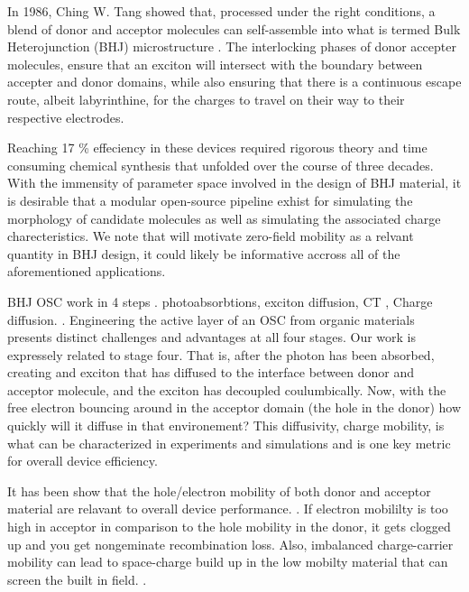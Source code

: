 In 1986, Ching W. Tang
showed that, processed under the right conditions, a blend of donor and acceptor molecules can self-assemble
into what is termed Bulk Heterojunction (BHJ) microstructure \cite{Tang1986c}. 
The interlocking phases of donor accepter molecules, ensure
that an exciton will intersect with the boundary between accepter and donor domains, while also ensuring that
there
is a continuous escape route, albeit labyrinthine, for the charges to travel on their way to their respective electrodes. 

Reaching 17 \% effeciency in these devices required rigorous theory and time consuming chemical synthesis
that unfolded over the course of three decades.  
With the immensity of parameter space involved in the design of BHJ material, it is desirable that a modular
open-source pipeline exhist for simulating the morphology of candidate molecules as well as simulating the 
associated charge charecteristics. 
We note that will motivate zero-field mobility as a relvant quantity in BHJ
design, it could likely be informative accross all of the aforementioned applications. 


BHJ OSC work in 4 steps . photoabsorbtions, exciton diffusion, CT , Charge diffusion. \citet{Fusella2019}. 
Engineering the active layer of an OSC from organic materials presents distinct challenges and advantages at
all four stages. 
Our work is expressely related to stage four. That is, after the photon has been absorbed, creating and
exciton that has diffused to the interface between donor and acceptor molecule, and the exciton has decoupled
coulumbically. Now, with the free electron bouncing around in the acceptor domain (the hole in the donor) how
quickly will it diffuse in that environement? This diffusivity, charge mobility, is what can be characterized in experiments and simulations and is one key metric for overall device efficiency.

It has been show that the hole/electron mobility of both donor and acceptor material are
relavant to overall device performance. \cite{Wang2019e}. If electron mobililty is too high
in acceptor  in comparison to the hole mobility in the donor, it gets clogged up and you get 
nongeminate recombination loss.
Also, imbalanced charge-carrier mobility can lead to space-charge build up in the low mobilty material that
can screen the built in field.  \cite{Bartelt2015}. 

